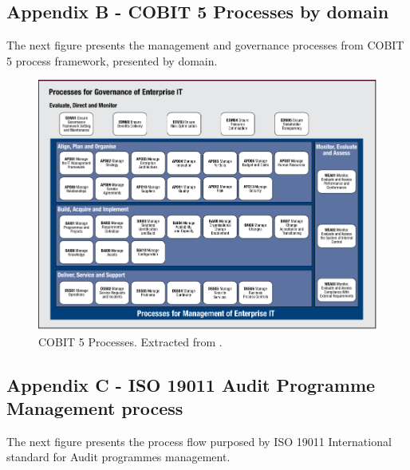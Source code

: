 \vspace{10mm}

\subsection{Appendix B - COBIT 5 Processes by domain} 

The next figure presents the management and governance processes from COBIT 5 process framework, presented by domain.

\begin{figure}[h!]
\centering
\includegraphics[width=\textwidth]{img/COBIT5ProcessFramework.png}
\caption{COBIT 5 Processes. Extracted from \cite{2012cobit}.}
\end{figure}

\newpage

\subsection{Appendix C - ISO 19011 Audit Programme Management process} 

The next figure presents the process flow purposed by ISO 19011 International standard for Audit programmes management.

